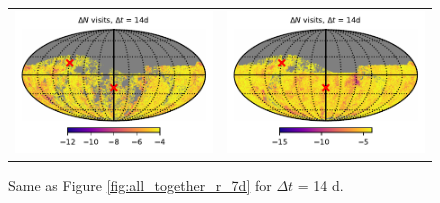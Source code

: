 \documentclass[preprintm,linenumbers]{aastex631}
\begin{document}
\begin{figure}
\begin{tabular}{@{}c@{}c@{}}
         \includegraphics{results/skymaps_cutout/skymaps_cutout_delta_first_year_one_snap_v4_0_10yrs_db_noDD_noTwi_tscale-14_nside-256_doAllTemplateMetrics_reduceCount_g_noDD_noTwi.pdf} &
         \includegraphics{results/skymaps_cutout/skymaps_cutout_delta_first_year_one_snap_v4_0_10yrs_db_noDD_noTwi_tscale-14_nside-256_doAllTemplateMetrics_reduceCount_r_noDD_noTwi.pdf} \\

   \end{tabular}

        \caption{
        Same as Figure \ref{fig:all_together_r_7d} for $\Delta t$ = 14 d. 
        }
        \label{fig:all_together_r_14d}
	\end{figure}

  
\end{document}
